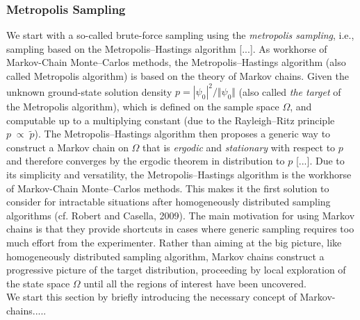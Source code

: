 \documentclass[11pt,a4paper]{article}
\numberwithin{equation}{section}
\begin{document}
\subsubsection{Metropolis Sampling}
%
%
We start with a so-called brute-force sampling using the \textit{metropolis sampling}, i.e., sampling based on the Metropolis--Hastings algorithm [...].
%
As workhorse of Markov-Chain Monte--Carlos methods, the Metropolis--Hastings algorithm (also called Metropolis algorithm) is based on the theory of Markov chains.
%
Given the unknown ground-state solution density $p=|\psi_0|^2/\Vert\psi_0\Vert$ (also called {\it the target} of the Metropolis algorithm), which is defined on the sample space $\Omega$, and computable up to a multiplying constant (due to the Rayleigh--Ritz principle $p \;\propto \;\tilde{p}$).
%
The Metropolis--Hastings algorithm then proposes a generic way to construct a Markov chain on $\Omega$ that is {\it ergodic} and {\it stationary} with respect to $p$ and therefore converges by the ergodic theorem in distribution to $p$ [...].
%
Due to its simplicity and versatility, the Metropolis--Hastings algorithm is the workhorse of Markov-Chain Monte--Carlos methods.
%
This makes it the first solution to consider for intractable situations after homogeneously distributed sampling algorithms (cf. Robert and Casella, 2009). 
%
The main motivation for using Markov chains is that they provide shortcuts in cases where generic sampling requires too much effort from the experimenter.
%
Rather than aiming at the big picture, like homogeneously distributed sampling algorithm, Markov chains construct a progressive picture of the target distribution, proceeding by local exploration of the state space $\Omega$ until all the regions of interest have been uncovered. \\
We start this section by briefly introducing the necessary concept of Markov-chains.....\\
\end{document}

